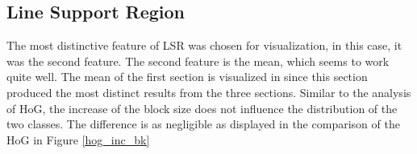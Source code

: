 
\subsection{Line Support Region}

The most distinctive feature of LSR was chosen for visualization, in this case,
it was the second feature. The second feature is the mean, which seems to work
quite well. The mean of the first section is visualized in since this section
produced the most distinct results from the three sections. Similar to the
analysis of HoG, the increase of the block size does not influence the
distribution of the two classes. The difference is as negligible as displayed in
the comparison of the HoG in Figure \ref{hog_inc_bk}


